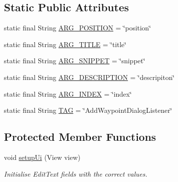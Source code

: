 \subsection*{Static Public Attributes}
\begin{DoxyCompactItemize}
\item 
static final String \hyperlink{classuk_1_1ac_1_1swan_1_1digitaltrails_1_1fragments_1_1_add_waypoint_dialog_fragment_ae5246fa7b2baf4efbd95c21e946300e1}{A\+R\+G\+\_\+\+P\+O\+S\+I\+T\+I\+O\+N} = \char`\"{}position\char`\"{}
\item 
static final String \hyperlink{classuk_1_1ac_1_1swan_1_1digitaltrails_1_1fragments_1_1_add_waypoint_dialog_fragment_ad4268e539f0c91fae91811245e56d4c5}{A\+R\+G\+\_\+\+T\+I\+T\+L\+E} = \char`\"{}title\char`\"{}
\item 
static final String \hyperlink{classuk_1_1ac_1_1swan_1_1digitaltrails_1_1fragments_1_1_add_waypoint_dialog_fragment_aa95ad5c154eed66fb388f0cb7edcd7a5}{A\+R\+G\+\_\+\+S\+N\+I\+P\+P\+E\+T} = \char`\"{}snippet\char`\"{}
\item 
static final String \hyperlink{classuk_1_1ac_1_1swan_1_1digitaltrails_1_1fragments_1_1_add_waypoint_dialog_fragment_a9e0a0e2f39659e27adcc2d7877d0bf7a}{A\+R\+G\+\_\+\+D\+E\+S\+C\+R\+I\+P\+T\+I\+O\+N} = \char`\"{}descripiton\char`\"{}
\item 
static final String \hyperlink{classuk_1_1ac_1_1swan_1_1digitaltrails_1_1fragments_1_1_add_waypoint_dialog_fragment_a9a027b90f90acbc36a2845ef91e96da9}{A\+R\+G\+\_\+\+I\+N\+D\+E\+X} = \char`\"{}index\char`\"{}
\item 
static final String \hyperlink{classuk_1_1ac_1_1swan_1_1digitaltrails_1_1fragments_1_1_add_waypoint_dialog_fragment_aa145770d7c02b78f466481179a257242}{T\+A\+G} = \char`\"{}Add\+Waypoint\+Dialog\+Listener\char`\"{}
\end{DoxyCompactItemize}
\subsection*{Protected Member Functions}
\begin{DoxyCompactItemize}
\item 
void \hyperlink{classuk_1_1ac_1_1swan_1_1digitaltrails_1_1fragments_1_1_add_waypoint_dialog_fragment_a179e450eec1d32cbe747364b7148af8e}{setup\+Ui} (View view)
\begin{DoxyCompactList}\small\item\em Initialise Edit\+Text fields with the correct values. \end{DoxyCompactList}\end{DoxyCompactItemize}


